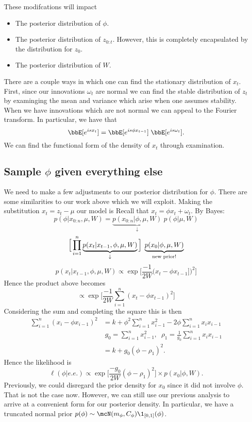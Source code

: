 \documentclass{article}
\begin{document}
These modifcations will impact
\begin{itemize}
\item The posterior distribution of $\phi$.
\item The posterior distribution of $z_{0:t}$.  However, this is completely encapsulated by the distribution for $z_{0}$.
\item The posterior distribution of $W$.
\end{itemize}

\begin{aside}
There are a couple ways in which one can find the stationary distribution of $x_t$.  First, since our innovations $\omega_t$ are normal we can find the stable distribution of $z_t$ by examinging the mean and variance which arise when one assumes stability.  When we have innovations which are not normal we can appeal to the Fourier transform.  In particular, we have that
\[
\bbE[e^{i s x_t}] = \bbE[e^{i s \phi x_{t-1}}] \; \bbE[e^{i s \omega_t}].
\]
We can find the functional form of the density of $x_t$ through examination.
\end{aside}

\subsection{Sample $\phi$ given everything else}

We need to make a few adjustments to our posterior distribution for $\phi$.  There are some similarities to our work above which we will exploit.  Making the substitution $x_t = z_t - \mu$ our model is
Recall that $x_t = \phi x_t + \omega_t$.  By Bayes:
\[
p(\phi | x_{0:n}, \mu, W) = 
\underbrace{p(x_{0:n} | \phi, \mu, W)}_{\downarrow}
\;  p(\phi | \mu, W)
\]
\[
\Big[ \prod_{i=1}^n \underbrace{p(x_t | x_{t-1}, \phi, \mu, W)}_{\downarrow} \Big]
\; \underbrace{ p(x_0 | \phi, \mu, W)}_{\textmd{new prior!}}
\]
\[
p(x_t | x_{t-1}, \phi, \mu, W) \propto \exp \Big[ \frac{-1}{2W} \Big( x_t -  \phi x_{t-1}] \Big)^2 \Big]
\]
Hence the product above becomes
\[
\propto \exp \Big[ \frac{-1}{2W} \sum_{i=1}^n ( x_t - \phi x_{t-1} )^2 \Big]
\]
Considering the sum and completing the square this is then
\begin{align*}
\sum_{i=1}^n (x_i - \phi x_{i-1})^2 
& = k + \phi^2 \sum_{i=1}^n x_{i-1}^2 - 2 \phi \sum_{i=1}^n x_i x_{i-1} \\
& \; g_0 = \sum_{i=1}^n x_{i-1}^2, \;\;   
\rho_1 = \frac{1}{g_0} \sum_{i=1}^n x_i x_{i-1} \\
& = k + g_0 ( \phi - \rho_1 )^2.
\end{align*}
Hence the likelihood is
\[
\ell(\phi | e.e.) \propto \exp \Big[ \frac{-g_0}{2W} (\phi - \rho_1)^2 \Big] \times p(x_0 | \phi, W).
\]
Previously, we could disregard the prior density for $x_0$ since it did not involve $\phi$.  That is not the case now.  However, we can still use our previous analysis to arrive at a convenient form for our posterior density.  In particular, we have a truncated normal prior $p(\phi) \sim \mcN(m_\phi, C_\phi) \1_{[0,1]}(\phi)$.
\end{document}
